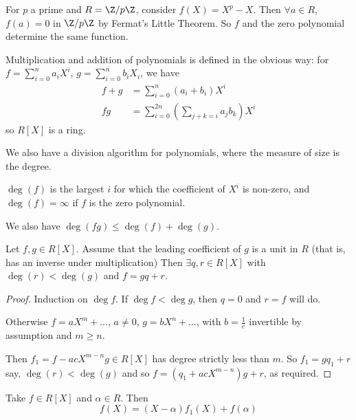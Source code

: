 \documentclass{article}
\begin{document}
\begin{eg}
    For $p$ a prime and $R = \Z/p\Z$, consider $f(X) = X^p - X$.
    Then $\forall a \in R$, $f(a) = 0$ in $\Z/p\Z$ by Fermat's Little Theorem.
    So $f$ and the zero polynomial determine the same function.
\end{eg}

Multiplication and addition of polynomials is defined in the obvious way: for $f = \sum_{i=0}^n a_i X^i$, $g = \sum_{i=0}^n b_i X_i$, we have
\begin{align*}
    f + g &= \sum_{i=0}^n (a_i + b_i) X^i \\
    fg &= \sum_{i=0}^{2n} \left(\sum_{j+k=i} a_j b_k\right) X^i
\end{align*}
so $R[X]$ is a ring.

We also have a division algorithm for polynomials, where the measure of size is the degree.

\begin{defi}
    $\deg(f)$ is the largest $i$ for which the coefficient of $X^i$ is non-zero, and $\deg(f) = \infty$ if $f$ is the zero polynomial.
\end{defi}

We also have $\deg(fg) \leq \deg(f) + \deg(g)$.

\begin{defi}
    Let $f, g \in R[X]$. Assume that the leading coefficient of $g$ is a unit in $R$ (that is, has an inverse under multiplication)
    Then $\exists q, r \in R[X]$ with $\deg(r) < \deg(g)$ and $f = gq + r$.
\end{defi}

\begin{proof}
    Induction on $\deg f$. If $\deg f < \deg g$, then $q = 0$ and $r = f$ will do.

    Otherwise $f = a X^m + \dots$, $a \neq 0$, $g = b X^n + \dots$, with $b = \frac{1}{c}$ invertible by assumption and $m \geq n$.

    Then $f_1 = f - ac X^{m-n} g \in R[X]$ has degree strictly less than $m$. So $f_1 = g q_1 + r$ say, $\deg(r) < \deg(g)$ and so $f = (q_1 + ac X^{m-n}) g + r$, as required.
\end{proof}

\begin{ncor}
    Take $f \in R[X]$ and $\alpha \in R$. Then \begin{equation*}f(X) = (X-\alpha) f_1(X) + f(\alpha)\end{equation*}
\end{ncor}
\end{document}
